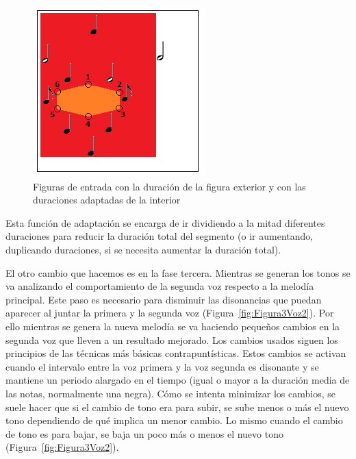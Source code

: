 		\begin{figure}[htbp]
		\centering
		\hspace*{0.0in}
		\includegraphics[scale=1]{graphics/simpletest4-F2_2.png}
		\caption{Figuras de entrada con la duración de la figura exterior y con las duraciones adaptadas de la interior}
		\label{fig:Figura2Voz2}
		\end{figure}

Esta función de adaptación se encarga de ir dividiendo a la mitad diferentes duraciones para reducir la duración total del segmento (o ir aumentando, duplicando duraciones, si se necesita aumentar la duración total). 

El otro cambio que hacemos es en la fase tercera. Mientras se generan los tonos se va analizando el comportamiento de la segunda voz respecto a la melodía principal. Este paso es necesario para disminuir las disonancias que puedan aparecer al juntar la primera y la segunda voz (Figura~\ref{fig:Figura3Voz2}). Por ello mientras se genera la nueva melodía se va haciendo pequeños cambios en la segunda voz que lleven a un resultado mejorado. Los cambios usados siguen los principios de las técnicas más básicas contrapuntísticas. Estos cambios se activan cuando el intervalo entre la voz primera y la voz segunda es disonante y se mantiene un periodo alargado en el tiempo (igual o mayor a la duración media de las notas, normalmente una negra). Cómo se intenta minimizar los cambios, se suele hacer que si el cambio de tono era para subir, se sube menos o más el nuevo tono dependiendo de qué implica un menor cambio. Lo mismo cuando el cambio de tono es para bajar, se baja un poco más o menos el nuevo tono (Figura~\ref{fig:Figura3Voz2}).

